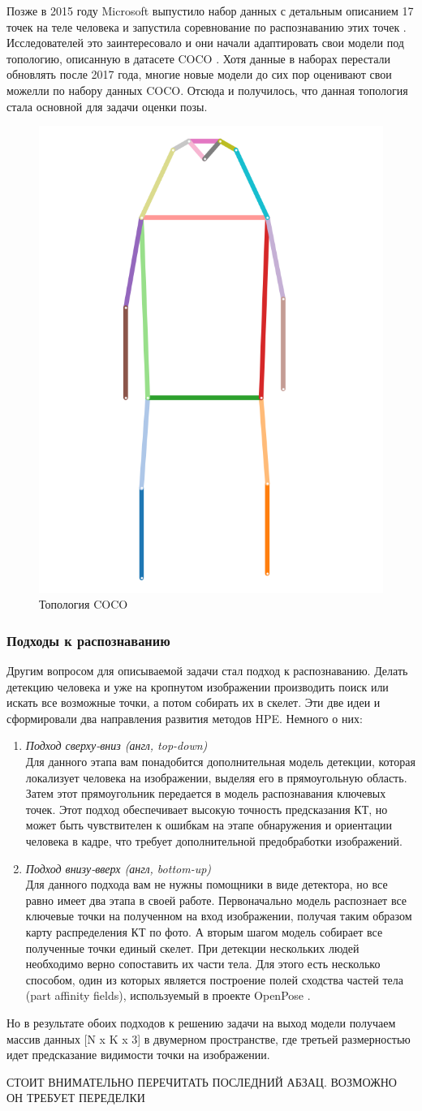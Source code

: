Позже в 2015 году Microsoft выпустило набор данных с детальным описанием 17 точек на теле человека и запустила соревнование по распознаванию этих точек \cite{COCO_dataset, COCO_topology}. Исследователей это заинтересовало и они начали адаптировать свои модели под топологию, описанную в датасете COCO \cite{COCO_dataset}. Хотя данные в наборах перестали обновлять после 2017 года, многие новые модели до сих пор оценивают свои можелли по набору данных COCO. Отсюда и получилось, что данная топология стала основной для задачи оценки позы.

\begin{figure}[h]
	\centering
	\includegraphics[width=.3\textwidth]{./images/coco_topology.png}
	\caption{Топология COCO}
	\label{fig:coco_topology}
\end{figure}

\subsubsection*{Подходы к распознаванию}

Другим вопросом для описываемой задачи стал подход к распознаванию. Делать детекцию человека и уже на кропнутом изображении производить поиск или искать все возможные точки, а потом собирать их в скелет. Эти две идеи и сформировали два направления развития методов HPE. Немного о них:
\begin{enumerate}
	\item \textit{Подход сверху-вниз (англ, top-down)}\\
	Для данного этапа вам понадобится дополнительная модель детекции, которая локализует человека на изображении, выделяя его в прямоугольную область. Затем этот прямоугольник передается в модель распознавания ключевых точек. Этот подход обеспечивает высокую точность предсказания КТ, но может быть чувствителен к ошибкам на этапе обнаружения и ориентации человека в кадре, что требует дополнительной предобработки изображений.
	\item \textit{Подход внизу-вверх (англ, bottom-up)}\\
	Для данного подхода вам не нужны помощники в виде детектора, но все равно имеет два этапа в своей работе. Первоначально модель распознает все ключевые точки на полученном на вход изображении, получая таким образом карту распределения КТ по фото. А вторым шагом модель собирает все полученные точки единый скелет. При детекции нескольких людей необходимо верно сопоставить их части тела. Для этого есть несколько способом, один из которых является построение полей сходства частей тела (part affinity fields), используемый в проекте OpenPose \cite{OpenPose}.
\end{enumerate}

Но в результате обоих подходов к решению задачи на выход модели получаем массив данных [N x K x 3] в двумерном пространстве, где третьей размерностью идет предсказание видимости точки на изображении.

СТОИТ ВНИМАТЕЛЬНО ПЕРЕЧИТАТЬ ПОСЛЕДНИЙ АБЗАЦ. ВОЗМОЖНО ОН ТРЕБУЕТ ПЕРЕДЕЛКИ
\newpage